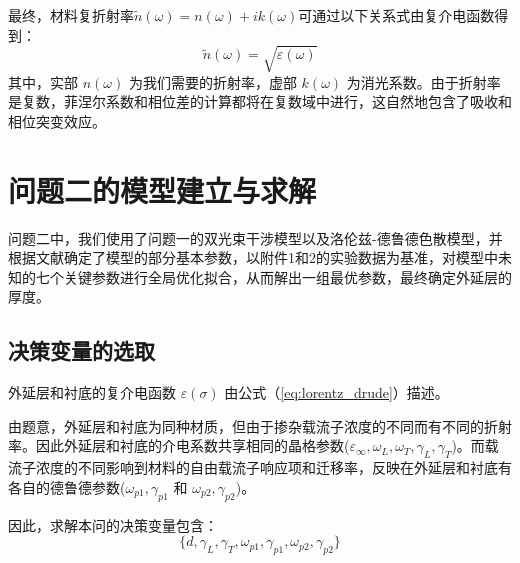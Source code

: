 \documentclass[a4paper]{ctexart}
\begin{document}
最终，材料复折射率$\tilde{n}(\omega) = n(\omega) + ik(\omega)$可通过以下关系式由复介电函数得到：
\begin{equation}
    \tilde{n}(\omega) = \sqrt{\varepsilon(\omega)}
\end{equation}
其中，实部 $n(\omega)$ 为我们需要的折射率，虚部 $k(\omega)$ 为消光系数。由于折射率是复数，菲涅尔系数和相位差的计算都将在复数域中进行，这自然地包含了吸收和相位突变效应。

\section{问题二的模型建立与求解}
问题二中，我们使用了问题一的双光束干涉模型以及洛伦兹-德鲁德色散模型，并根据文献确定了模型的部分基本参数，以附件1和2的实验数据为基准，对模型中未知的七个关键参数进行全局优化拟合，从而解出一组最优参数，最终确定外延层的厚度。
\subsection{决策变量的选取}
外延层和衬底的复介电函数 $\varepsilon(\sigma)$ 由公式（\ref{eq:lorentz_drude}）描述。

由题意，外延层和衬底为同种材质，但由于掺杂载流子浓度的不同而有不同的折射率。因此外延层和衬底的介电系数共享相同的晶格参数($\varepsilon_{\infty}, \omega_L, \omega_T, \gamma_L, \gamma_T$)。而载流子浓度的不同影响到材料的自由载流子响应项和迁移率，反映在外延层和衬底有各自的德鲁德参数($\omega_{p1}, \gamma_{p1}$ 和 $\omega_{p2}, \gamma_{p2}$)。
    
因此，求解本问的决策变量包含：
\begin{equation}
    \{d, \gamma_L, \gamma_T, \omega_{p1}, \gamma_{p1}, \omega_{p2}, \gamma_{p2}\}
\end{equation}



\end{document}

